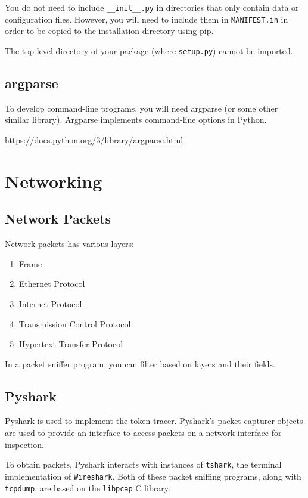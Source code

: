 \documentclass{article}
\begin{document}
You do not need to include \texttt{\_\_init\_\_.py} in directories that only
contain data or configuration files.
However, you will need to include them in \texttt{MANIFEST.in} in order
to be copied to the installation directory using pip.

The top-level directory of your package (where \texttt{setup.py}) cannot be imported.


\subsection{argparse}

To develop command-line programs, you will need argparse
(or some other similar library). Argparse implements
command-line options in Python.

\url{https://docs.python.org/3/library/argparse.html}

\newpage

\section{Networking}

\subsection{Network Packets}


Network packets has various layers:
\begin{enumerate}
\item Frame
\item Ethernet Protocol
\item Internet Protocol
\item Transmission Control Protocol
\item Hypertext Transfer Protocol
\end{enumerate}
In a packet sniffer program, you can filter based on layers and their fields.


\subsection{Pyshark}

Pyshark is used to implement the token tracer. Pyshark's
packet capturer objects are used to provide an interface 
to access packets on a network interface for inspection.

To obtain packets, Pyshark interacts with instances of \texttt{tshark}, 
the terminal implementation of \texttt{Wireshark}. Both of these 
packet sniffing programs, along with \texttt{tcpdump}, are
based on the \texttt{libpcap} C library.
\end{document}

